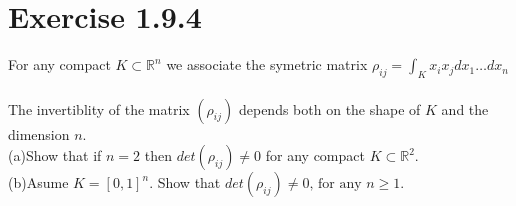 \documentclass{report}
\begin{document}
\section*{Exercise 1.9.4}


For any compact $K \subset \mathbb{R}^n$ we associate the symetric matrix $\displaystyle \rho_{ij} = \int_{K} x_i x_j d x_1 \dots d x_n$ \\
\\
The invertiblity of the matrix $(\rho_{ij})$ depends both on the shape of $K$ and the dimension $n$. \\
(a)Show that if $n = 2$ then $det(\rho_{ij}) \neq 0$ for any compact $K \subset \mathbb{R}^2$.\\
(b)Asume $K = [0,1]^n$. Show that $det(\rho_{ij}) \neq 0 \text{, for any $n \geq 1$}$.
\end{document}
